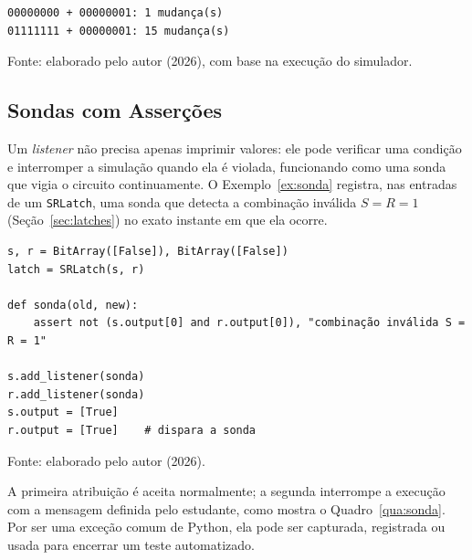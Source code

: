 \begin{quadro}[H]
\centering
\caption{Atividade de chaveamento medida pelo Exemplo~\ref{ex:atividade}.}
\label{qua:atividade}
\begin{minipage}{0.6\textwidth}
\begin{verbatim}
00000000 + 00000001: 1 mudança(s)
01111111 + 00000001: 15 mudança(s)
\end{verbatim}
\end{minipage}
\begin{center}
\footnotesize Fonte: elaborado pelo autor (2026), com base na execução do simulador.
\end{center}
\end{quadro}

\subsection{Sondas com Asserções}

Um \textit{listener} não precisa apenas imprimir valores: ele pode verificar uma condição e interromper a simulação quando ela é violada, funcionando como uma sonda que vigia o circuito continuamente. O Exemplo~\ref{ex:sonda} registra, nas entradas de um \texttt{SRLatch}, uma sonda que detecta a combinação inválida $S = R = 1$ (Seção~\ref{sec:latches}) no exato instante em que ela ocorre.

\begin{exemplo}[H]
\caption{Sonda que detecta a combinação inválida do \textit{latch} SR.}
\label{ex:sonda}
\begin{verbatim}
s, r = BitArray([False]), BitArray([False])
latch = SRLatch(s, r)

def sonda(old, new):
    assert not (s.output[0] and r.output[0]), "combinação inválida S = R = 1"

s.add_listener(sonda)
r.add_listener(sonda)
s.output = [True]
r.output = [True]    # dispara a sonda
\end{verbatim}
\begin{center}
\footnotesize Fonte: elaborado pelo autor (2026).
\end{center}
\end{exemplo}

A primeira atribuição é aceita normalmente; a segunda interrompe a execução com a mensagem definida pelo estudante, como mostra o Quadro~\ref{qua:sonda}. Por ser uma exceção comum de Python, ela pode ser capturada, registrada ou usada para encerrar um teste automatizado.

